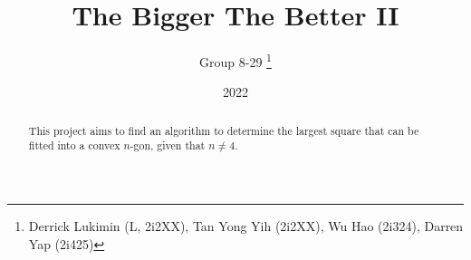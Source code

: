 \documentclass[11pt]{article}
\title{The Bigger The Better II}
\author{Group 8-29 \thanks{Derrick Lukimin (L, 2i2XX), Tan Yong Yih (2i2XX), Wu Hao (2i324), Darren Yap (2i425)}}
\date{2022}
\begin{document}
\onehalfspacing
\maketitle
\tableofcontents

\begin{abstract}
  This project aims to find an algorithm to determine
  the largest square that can be fitted into a convex
  $n$-gon, given that $n \neq 4$.
\end{abstract}
\end{document}
